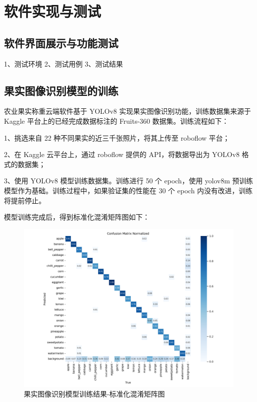 \chapter{软件实现与测试}

\section{软件界面展示与功能测试}

1、测试环境
2、测试用例
3、测试结果

\section{果实图像识别模型的训练}

农业果实称重云端软件基于 YOLOv8 实现果实图像识别功能，训练数据集来源于 Kaggle 平台上的已经完成数据标注的 Fruits-360 数据集。训练流程如下：

1、挑选来自 22 种不同果实的近三千张照片，将其上传至 roboflow 平台；

2、在 Kaggle 云平台上，通过 roboflow 提供的 API，将数据导出为 YOLOv8 格式的数据集；

3、使用 YOLOv8 模型训练数据集。训练进行 50 个 epoch，使用 yolov8m 预训练模型作为基础。训练过程中，如果验证集的性能在 30 个 epoch 内没有改进，训练将提前停止。

模型训练完成后，得到标准化混淆矩阵图如下：

\begin{figure}[H]
    \centering
    \includegraphics[width=0.8\linewidth]{../source/aws-img/yolov8/out/image/confusion_matrix_normalized.png}
    \caption{果实图像识别模型训练结果-标准化混淆矩阵图}
    \label{fig:confusion_matrix_normalized}
\end{figure}

